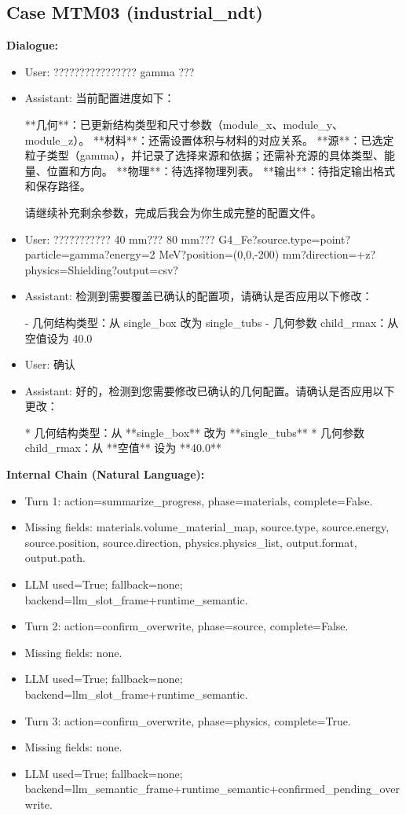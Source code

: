 \documentclass[11pt]{ctexart}
\begin{document}
\subsection{Case MTM03 (industrial\_ndt)}
\textbf{Dialogue:}
\begin{itemize}
\item User: ???????????????? gamma ???
\item Assistant: 当前配置进度如下：

**几何**：已更新结构类型和尺寸参数（module\_x、module\_y、module\_z）。  
**材料**：还需设置体积与材料的对应关系。  
**源**：已选定粒子类型（gamma），并记录了选择来源和依据；还需补充源的具体类型、能量、位置和方向。  
**物理**：待选择物理列表。  
**输出**：待指定输出格式和保存路径。

请继续补充剩余参数，完成后我会为你生成完整的配置文件。
\item User: ??????????? 40 mm??? 80 mm??? G4\_Fe?source.type=point?particle=gamma?energy=2 MeV?position=(0,0,-200) mm?direction=+z?physics=Shielding?output=csv?
\item Assistant: 检测到需要覆盖已确认的配置项，请确认是否应用以下修改：

- 几何结构类型：从 single\_box 改为 single\_tubs
- 几何参数 child\_rmax：从空值设为 40.0
\item User: 确认
\item Assistant: 好的，检测到您需要修改已确认的几何配置。请确认是否应用以下更改：

*   几何结构类型：从 **single\_box** 改为 **single\_tubs**
*   几何参数 child\_rmax：从 **空值** 设为 **40.0**
\end{itemize}
\textbf{Internal Chain (Natural Language):}
\begin{itemize}
\item Turn 1: action=summarize\_progress, phase=materials, complete=False.
\item Missing fields: materials.volume\_material\_map, source.type, source.energy, source.position, source.direction, physics.physics\_list, output.format, output.path.
\item LLM used=True; fallback=none; backend=llm\_slot\_frame+runtime\_semantic.
\item Turn 2: action=confirm\_overwrite, phase=source, complete=False.
\item Missing fields: none.
\item LLM used=True; fallback=none; backend=llm\_slot\_frame+runtime\_semantic.
\item Turn 3: action=confirm\_overwrite, phase=physics, complete=True.
\item Missing fields: none.
\item LLM used=True; fallback=none; backend=llm\_semantic\_frame+runtime\_semantic+confirmed\_pending\_overwrite.
\end{itemize}
\end{document}
